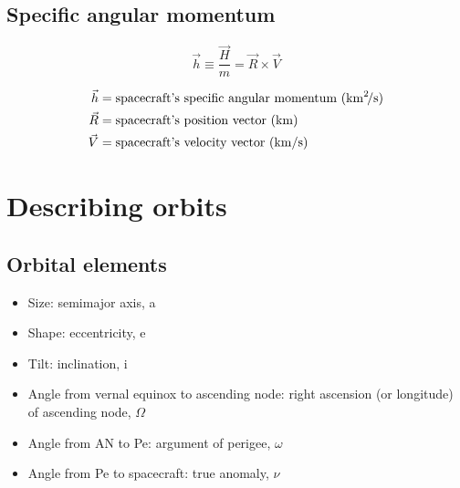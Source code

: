 \documentclass{article}
\begin{document}
\subsection{Specific angular momentum}
\begin{multicols}{3}
	\begin{equation*}
	\boxed{\vec{h} \equiv \dfrac{\vec{H}}{m} = \vec{R} \times \vec{V}}
	\end{equation*}

	\vfill\null
	\columnbreak

	\begin{align*}
	\vec{h} &= \text{spacecraft's specific angular momentum (\si{\kilo\meter\squared\per\second})}\\
	\vec{R} &= \text{spacecraft's position vector (\si{\kilo\meter})}\\
	\vec{V} &= \text{spacecraft's velocity vector (\si{\kilo\meter\per\second})}\\
	\end{align*}
\end{multicols}

\section{Describing orbits}
\subsection{Orbital elements}
\begin{itemize}
	\item Size: semimajor axis, a
	\item Shape: eccentricity, e
	\item Tilt: inclination, i
	\item Angle from vernal equinox to ascending node: right ascension (or longitude) of ascending node, $\Omega$
	\item Angle from AN to Pe: argument of perigee, $\omega$
	\item Angle from Pe to spacecraft: true anomaly, $\nu$
\end{itemize}
\end{document}
